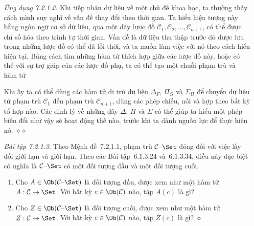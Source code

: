 \noindent\textit{Ứng dụng 7.2.1.2.}\keepwithnext
Khi tiếp nhận dữ liệu về một chủ đề khoa học, ta thường thấy cách mình suy nghĩ về vấn đề thay đổi theo thời gian. Ta hiểu hiện tượng này bằng ngôn ngữ cơ sở dữ liệu, qua một dãy lược đồ $\mathcal C_1,\mathcal C_2,\ldots,\mathcal C_{n+1}$, có thể được chỉ số hóa theo trình tự thời gian. Vấn đề là dữ liệu thu thập trước đó được lưu trong những lược đồ có thể đã lỗi thời, và ta muốn làm việc với nó theo cách hiểu hiện tại. Bằng cách tìm những hàm tử thích hợp giữa các lược đồ này, hoặc có thể với sự trợ giúp của các lược đồ phụ, ta có thể tạo một chuỗi phạm trù và hàm tử
\begin{center}
\end{center}
Khi ấy ta có thể dùng các hàm tử di trú dữ liệu $\Delta_F$, $\Pi_G$ và $\Sigma_H$ để chuyển dữ liệu từ phạm trù $\mathcal C_1$ đến phạm trù $\mathcal C_{n+1}$, dùng các phép chiếu, nối và hợp theo bất kỳ tổ hợp nào. Các định lý
về những dãy $\Delta$, $\Pi$ và $\Sigma$ có thể giúp ta hiểu một phép biến đổi như vậy sẽ hoạt động thế nào, trước khi ta dành nguồn lực để thực hiện nó.
\hfill$\diamond\diamond$

\noindent\textit{Bài tập 7.2.1.3.}\keepwithnext
Theo Mệnh đề~7.2.1.1, phạm trù $\mathcal C\text{--}\Set$ đóng đối với việc lấy đối giới hạn và giới hạn. Theo các Bài tập~6.1.3.24 và~6.1.3.34, điều này đặc biệt có nghĩa là $\mathcal C\text{--}\Set$ có một đối tượng đầu và một đối tượng cuối.
\begin{enumerate}[label=\alph*.]
\item Cho $A\in\Ob(\mathcal C\text{--}\Set)$ là đối tượng đầu, được xem như một hàm tử $A:\mathcal C\to\Set$. Với bất kỳ $c\in\Ob(\mathcal C)$ nào, tập $A(c)$ là gì?
\item Cho $Z\in\Ob(\mathcal C\text{--}\Set)$ là đối tượng cuối, được xem như một hàm tử $Z:\mathcal C\to\Set$. Với bất kỳ $c\in\Ob(\mathcal C)$ nào, tập $Z(c)$ là gì?
\nobreak\hfill$\diamond$
\end{enumerate}

